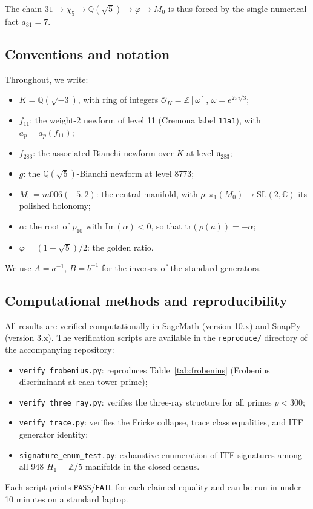 The chain $31 \to \chi_5 \to \mathbb{Q}(\sqrt{5}) \to \varphi \to M_0$
is thus forced by the single numerical fact $a_{31} = 7$.

\subsection{Conventions and notation}

Throughout, we write:
\begin{itemize}
  \item $K = \mathbb{Q}(\sqrt{-3})$, with ring of integers
        $\mathcal{O}_K = \mathbb{Z}[\omega]$, $\omega = e^{2\pi i/3}$;
  \item $f_{11}$: the weight-2 newform of level 11
        (Cremona label \texttt{11a1}), with $a_p = a_p(f_{11})$;
  \item $f_{283}$: the associated Bianchi newform over $K$ at level $\mathfrak{n}_{283}$;
  \item $g$: the $\mathbb{Q}(\sqrt{5})$-Bianchi newform at level 8773;
  \item $M_0 = m006(-5,2)$: the central manifold, with
        $\rho\colon \pi_1(M_0) \to \mathrm{SL}(2,\mathbb{C})$
        its polished holonomy;
  \item $\alpha$: the root of $p_{10}$ with $\mathrm{Im}(\alpha) < 0$,
        so that $\mathrm{tr}(\rho(a)) = -\alpha$;
  \item $\varphi = (1+\sqrt{5})/2$: the golden ratio.
\end{itemize}
We use $A = a^{-1}$, $B = b^{-1}$ for the inverses of the standard
generators.

\subsection{Computational methods and reproducibility}

All results are verified computationally in SageMath (version 10.x)
and SnapPy (version 3.x). The verification scripts are available in
the \texttt{reproduce/} directory of the accompanying repository:
\begin{itemize}
  \item \texttt{verify\_frobenius.py}: reproduces Table~\ref{tab:frobenius}
        (Frobenius discriminant at each tower prime);
  \item \texttt{verify\_three\_ray.py}: verifies the three-ray structure
        for all primes $p < 300$;
  \item \texttt{verify\_trace.py}: verifies the Fricke collapse, trace
        class equalities, and ITF generator identity;
  \item \texttt{signature\_enum\_test.py}: exhaustive enumeration of
        ITF signatures among all 948 $H_1 = \mathbb{Z}/5$ manifolds
        in the closed census.
\end{itemize}
Each script prints \texttt{PASS}/\texttt{FAIL} for each claimed equality
and can be run in under 10 minutes on a standard laptop.

